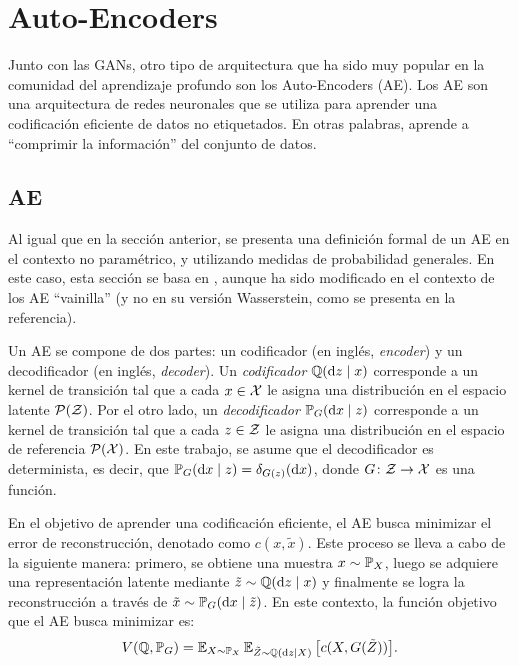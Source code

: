 

\section{Auto-Encoders}\label{sec:auto-Encoders}  %

Junto con las GANs, otro tipo de arquitectura que ha sido muy popular en la comunidad del aprendizaje profundo son los Auto-Encoders (AE). Los AE son una arquitectura de redes neuronales que se utiliza para aprender una codificación eficiente de datos no etiquetados. En otras palabras, aprende a ``comprimir la información'' del conjunto de datos.

\subsection{AE}\label{ssec:AE}  %

Al igual que en la sección anterior, se presenta una definición formal de un AE en el contexto no paramétrico, y utilizando medidas de probabilidad generales. En este caso, esta sección se basa en \cite{tolstikhin2017wasserstein}, aunque ha sido modificado en el contexto de los AE ``vainilla'' (y no en su versión Wasserstein, como se presenta en la referencia).

Un AE se compone de dos partes: un codificador (en inglés, \textit{encoder}) y un decodificador (en inglés, \textit{decoder}).
Un \textit{codificador} $ \ProbQ(\dz \mid x)$ corresponde a un kernel de transición tal que a cada $x \in \cX$ le asigna una distribución en el espacio latente $ \ProbSpace[\cZ] $.
Por el otro lado, un \textit{decodificador} $\Prob_G(\dx \mid z)$ corresponde a un kernel de transición tal que a cada $z \in \cZ$ le asigna una distribución en el espacio de referencia $\ProbSpace[\cX]$.
En este trabajo, se asume que el decodificador es determinista, es decir, que $\Prob_G(\dx \mid z) = \delta_{G(z)}(\dx)$, donde $G\colon \cZ \to \cX$ es una función.

En el objetivo de aprender una codificación eficiente, el AE busca minimizar el error de reconstrucción, denotado como $c(x, \tilde x)$. Este proceso se lleva a cabo de la siguiente manera: primero, se obtiene una muestra $x\sim \Prob_X$, luego se adquiere una representación latente mediante $\tilde z \sim \ProbQ(\dz \mid x)$ y finalmente se logra la reconstrucción a través de $\tilde x \sim \Prob_G(\dx \mid \tilde z)$. En este contexto, la función objetivo que el AE busca minimizar es:
\begin{equation}\label{eq:ae-obj-func}
    V(\ProbQ, \Prob_G) = \Exp_{X \sim \Prob_X} \Exp_{\tilde Z \sim \ProbQ(\dz \mid X)} \qty\big[ c(X, G(\tilde Z)) ].
\end{equation}

